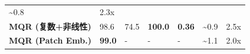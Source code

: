 \documentclass[
  12pt,
]{article}
\begin{document}
\begin{longtable}[]{@{}lllllll@{}}
\begin{minipage}[t]{0.12\columnwidth}
\textasciitilde0.8\strut
\end{minipage} & \begin{minipage}[t]{0.12\columnwidth}\raggedright
2.3x\strut
\end{minipage}\tabularnewline
\begin{minipage}[t]{0.12\columnwidth}\raggedright
\textbf{MQR (复数+非线性)}\strut
\end{minipage} & \begin{minipage}[t]{0.12\columnwidth}\raggedright
98.6\strut
\end{minipage} & \begin{minipage}[t]{0.12\columnwidth}\raggedright
74.5\strut
\end{minipage} & \begin{minipage}[t]{0.12\columnwidth}\raggedright
\textbf{100.0}\strut
\end{minipage} & \begin{minipage}[t]{0.12\columnwidth}\raggedright
\textbf{0.36}\strut
\end{minipage} & \begin{minipage}[t]{0.12\columnwidth}\raggedright
\textasciitilde0.9\strut
\end{minipage} & \begin{minipage}[t]{0.12\columnwidth}\raggedright
2.5x\strut
\end{minipage}\tabularnewline
\begin{minipage}[t]{0.12\columnwidth}\raggedright
\textbf{MQR (Patch Emb.)}\strut
\end{minipage} & \begin{minipage}[t]{0.12\columnwidth}\raggedright
\textbf{99.0}\strut
\end{minipage} & \begin{minipage}[t]{0.12\columnwidth}\raggedright
-\strut
\end{minipage} & \begin{minipage}[t]{0.12\columnwidth}\raggedright
-\strut
\end{minipage} & \begin{minipage}[t]{0.12\columnwidth}\raggedright
-\strut
\end{minipage} & \begin{minipage}[t]{0.12\columnwidth}\raggedright
\textasciitilde1.1\strut
\end{minipage} & \begin{minipage}[t]{0.12\columnwidth}\raggedright
2.0x\strut
\end{minipage}\tabularnewline
\bottomrule
\end{longtable}
\end{document}
